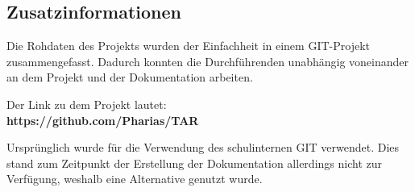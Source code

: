 \subsection{Zusatzinformationen}\label{vw_zusatzinformationen}
Die Rohdaten des Projekts wurden der Einfachheit in einem GIT-Projekt zusammengefasst. Dadurch konnten die Durchführenden unabhängig voneinander an dem Projekt und der Dokumentation arbeiten.\par
Der Link zu dem Projekt lautet:\\
\textbf{https://github.com/Pharias/TAR}\par
Ursprünglich wurde für die Verwendung des schulinternen GIT verwendet. Dies stand zum Zeitpunkt der Erstellung der Dokumentation allerdings nicht zur Verfügung, weshalb eine Alternative genutzt wurde.
